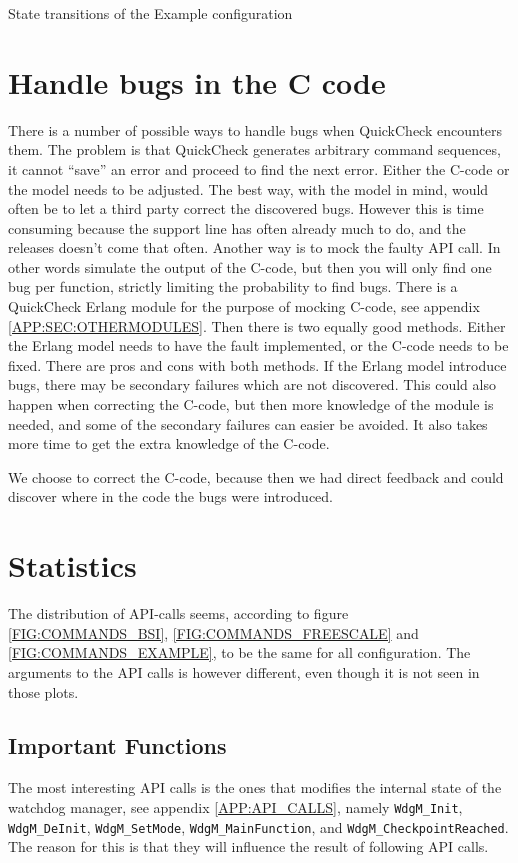 \begin{table}[!ht]
  \caption{State transitions of the Example configuration}
  \label{TABLE:STATUSES_EXAMPLE}
  
\end{table}

\section{Handle bugs in the C code}
\label{sec:handlebugs}
There is a number of possible ways to handle bugs when QuickCheck
encounters them. The problem is that QuickCheck generates arbitrary
command sequences, it cannot ``save'' an error and proceed to find the
next error. Either the C-code or the model needs to be adjusted.  The
best way, with the model in mind, would often be to let a third party
correct the discovered bugs. However this is time consuming because
the support line has often already much to do, and the releases
doesn't come that often.  Another way is to mock the faulty API
call. In other words simulate the output of the C-code, but then you
will only find one bug per function, strictly limiting the probability
to find bugs. There is a QuickCheck Erlang module for the purpose of
mocking C-code, see appendix \ref{APP:SEC:OTHERMODULES}. Then there is
two equally good methods. Either the Erlang model needs to have the
fault implemented, or the C-code needs to be fixed. There are pros and
cons with both methods. If the Erlang model introduce bugs, there may
be secondary failures which are not discovered. This could also happen
when correcting the C-code, but then more knowledge of the module is
needed, and some of the secondary failures can easier be avoided. It
also takes more time to get the extra knowledge of the C-code.

We choose to correct the C-code, because then we had direct feedback
and could discover where in the code the bugs were introduced.

\section{Statistics}
The distribution of API-calls seems, according to figure
\ref{FIG:COMMANDS_BSI}, \ref{FIG:COMMANDS_FREESCALE} and
\ref{FIG:COMMANDS_EXAMPLE}, to be the same for all configuration. The
arguments to the API calls is however different, even though it is not
seen in those plots.

\subsection{Important Functions}
The most interesting API calls is the ones that
modifies the internal state of the watchdog manager, see appendix
\ref{APP:API_CALLS}, namely \lstinline!WdgM_Init!,
\lstinline!WdgM_DeInit!, \lstinline!WdgM_SetMode!,
\lstinline!WdgM_MainFunction!, and
\lstinline!WdgM_CheckpointReached!. The reason for this is that they
will influence the result of following API calls.

